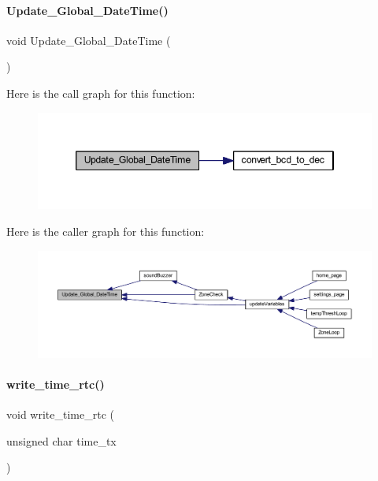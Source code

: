 \paragraph{Update\+\_\+\+Global\+\_\+\+Date\+Time()}
{\footnotesize\ttfamily void Update\+\_\+\+Global\+\_\+\+Date\+Time (\begin{DoxyParamCaption}{ }\end{DoxyParamCaption})}

Here is the call graph for this function\+:
\nopagebreak
\begin{figure}[H]
\begin{center}
\leavevmode
\includegraphics[width=346pt]{a00014_a93b2ace39d0d582b18b136c908d8f092_cgraph}
\end{center}
\end{figure}
Here is the caller graph for this function\+:
\nopagebreak
\begin{figure}[H]
\begin{center}
\leavevmode
\includegraphics[width=350pt]{a00014_a93b2ace39d0d582b18b136c908d8f092_icgraph}
\end{center}
\end{figure}
\mbox{\label{a00014_aadecf4eb7d23c63d1216ced71440654e}} 
\paragraph{write\+\_\+time\+\_\+rtc()}
{\footnotesize\ttfamily void write\+\_\+time\+\_\+rtc (\begin{DoxyParamCaption}\item[{unsigned char}]{time\+\_\+tx }\end{DoxyParamCaption})}

